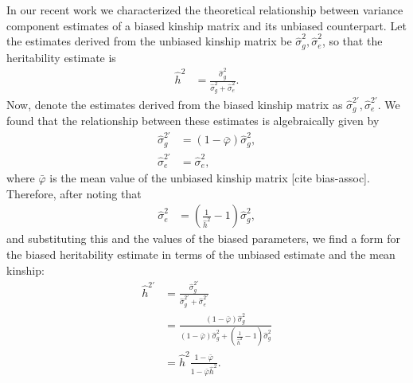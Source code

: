 \documentclass[11pt]{article}
\begin{document}
In our recent work we characterized the theoretical relationship between variance component estimates of a biased kinship matrix and its unbiased counterpart.
Let the estimates derived from the unbiased kinship matrix be $\hat{\sigma}^2_g, \hat{\sigma}^2_e$, so that the heritability estimate is
\begin{align*}
  \hat{h}^2
  &=
    \frac{
    \hat{\sigma}^2_g
    }{
    \hat{\sigma}^2_g + \hat{\sigma}^2_e
    }
  .
\end{align*}
Now, denote the estimates derived from the biased kinship matrix as
$\hat{\sigma}^{2\prime}_g, \hat{\sigma}^{2\prime}_e$.
We found that the relationship between these estimates is algebraically given by
\begin{align*}
  \hat{\sigma}^{2\prime}_g
  &=
    (1 - \bar{\varphi}) \hat{\sigma}^2_g
    , \\
  \hat{\sigma}^{2\prime}_e
  &=
    \hat{\sigma}^2_e
    ,
\end{align*}
where $\bar{\varphi}$ is the mean value of the unbiased kinship matrix [cite bias-assoc].
Therefore, after noting that
\begin{align*}
  \hat{\sigma}^2_e
  &=
    \left( \frac{ 1 }{ \hat{h}^2 } - 1 \right) \hat{\sigma}^2_g 
    ,
\end{align*}
and substituting this and the values of the biased parameters, we find a form for the biased heritability estimate in terms of the unbiased estimate and the mean kinship:
\begin{align*}
  \hat{h}^{2\prime}
  &=
    \frac{
    \hat{\sigma}^{2\prime}_g
    }{
    \hat{\sigma}^{2\prime}_g + \hat{\sigma}^{2\prime}_e
    }
  \\
  &=
    \frac{
    (1 - \bar{\varphi}) \hat{\sigma}^2_g
    }{
    (1 - \bar{\varphi}) \hat{\sigma}^2_g
    + \left( \frac{ 1 }{ \hat{h}^2 } - 1 \right) \hat{\sigma}^2_g 
    }
  \\
  &=
    \hat{h}^2
    \frac{
    1 - \bar{\varphi}
    }{
    1 - \bar{\varphi} \hat{h}^2
    }
    .
\end{align*}
\end{document}
